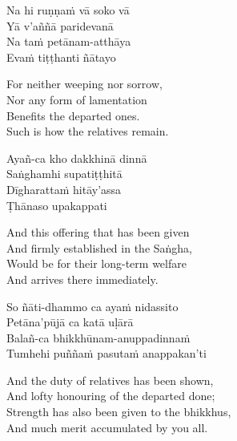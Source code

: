 \begin{pali-hang-continued}
Na hi ruṇṇaṁ vā soko vā\\
Yā v'aññā paridevanā\\
Na taṁ petānam-atthāya\\
Evaṁ tiṭṭhanti ñātayo
\end{pali-hang-continued}

\begin{english-verses}
  For neither weeping nor sorrow,\\
  Nor any form of lamentation\\
  Benefits the departed ones.\\
  Such is how the relatives remain.
\end{english-verses}

\begin{pali-hang-continued}
Ayañ-ca kho dakkhinā dinnā\\
Saṅghamhi supatiṭṭhitā\\
Dīgharattaṁ hitāy'assa\\
Ṭhānaso upakappati
\end{pali-hang-continued}

\begin{english-verses}
  And this offering that has been given\\
  And firmly established in the Saṅgha,\\
  Would be for their long-term welfare\\
  And arrives there immediately.
\end{english-verses}

\begin{pali-hang-continued}
So ñāti-dhammo ca ayaṁ nidassito\\
Petāna'pūjā ca katā uḷārā\\
Balañ-ca bhikkhūnam-anuppadinnaṁ\\
Tumhehi puññaṁ pasutaṁ anappakan'ti
\end{pali-hang-continued}

\begin{english-verses}
  And the duty of relatives has been shown,\\
  And lofty honouring of the departed done;\\
  Strength has also been given to the bhikkhus,\\
  And much merit accumulated by you all.
\end{english-verses}

\suttaRef{[Khp 7]}

